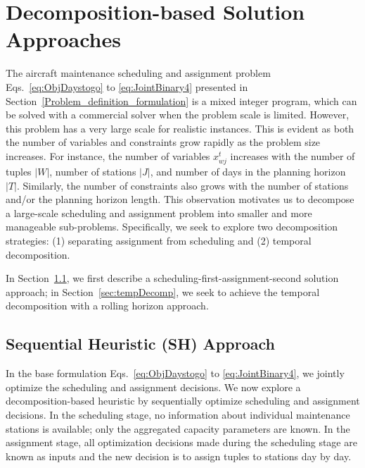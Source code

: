 \section{Decomposition-based Solution Approaches}
\label{section:solutionmethodology}
The aircraft maintenance scheduling and assignment problem Eqs.~\eqref{eq:ObjDaystogo} to \eqref{eq:JointBinary4} presented in Section~\ref{Problem_definition_formulation} is a mixed integer program, which can be solved with a commercial solver when the problem scale is limited. However, this problem has a very large scale for realistic instances. This is evident as both the number of variables and constraints grow rapidly as the problem size increases. For instance, the number of variables $x_{wj}^t$ increases with the number of tuples $|W|$, number of stations $|J|$, and number of days in the planning horizon $|T|$. Similarly, the number of constraints also grows with the number of stations and/or the planning horizon length. This observation motivates us to decompose a large-scale scheduling and assignment problem into smaller and more manageable sub-problems. Specifically, we seek to explore two decomposition strategies: (1) separating assignment from scheduling and (2) temporal decomposition.

In Section~\ref{sec:SchedulingThenAssign}, we first describe a scheduling-first-assignment-second solution approach; in Section~\ref{sec:tempDecomp}, we seek to achieve the temporal decomposition with a rolling horizon approach.

 


\subsection{Sequential Heuristic (SH) Approach}
\label{sec:SchedulingThenAssign}
In the base formulation Eqs.~\eqref{eq:ObjDaystogo} to \eqref{eq:JointBinary4}, we jointly optimize the scheduling and assignment decisions. We now explore a decomposition-based heuristic by sequentially optimize scheduling and assignment decisions. In the scheduling stage, no information about individual maintenance stations is available; only the aggregated capacity parameters are known. In the assignment stage, all optimization decisions made during the scheduling stage are known as inputs and the new decision is to assign tuples to stations day by day.

